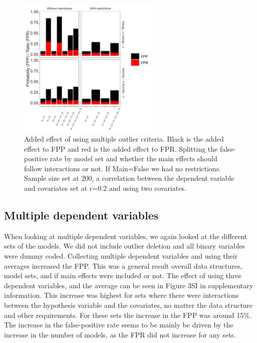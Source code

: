 \begin{figure}[t]
\includegraphics[width=0.6\textwidth]{R/Analysis/Result/Figures/Figure1B.jpeg}
\centering
\caption{Added effect of using multiple outlier criteria. Black is the added effect to FPP and red is the added effect to FPR.  Splitting the false-positive rate by model set and whether the main effects should follow interactions or not. If Main=False we had no restrictions. Sample size set at 200, a correlation between the dependent variable and covariates set at r=0.2 and using two covariates.}
\label{fig:mainfigure}
\end{figure}

\subsection{Multiple dependent variables}
When looking at multiple dependent variables, we again looked at the different sets of the models. We did not include outlier deletion and all binary variables were dummy coded. Collecting multiple dependent variables and using their averages increased the FPP. This was a general result overall data structures, model sets, and if main effects were included or not. The effect of using three dependent variables, and the average can be seen in Figure 3SI in supplementary information. This increase was highest for sets where there were interactions between the hypothesis variable and the covariates, no matter the data structure and other requirements. For these sets the increase in the FPP was around 15\%. The increase in the false-positive rate seems to be mainly be driven by the increase in the number of models, as the FPR did not increase for any sets. 


